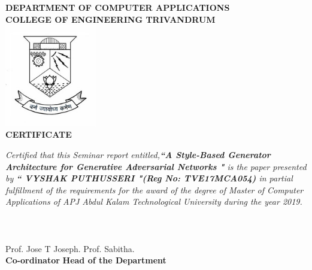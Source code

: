 
\begin{titlepage}
\begin{center}
\textbf{DEPARTMENT OF COMPUTER APPLICATIONS}\\[0.5cm]
\textbf{ COLLEGE OF ENGINEERING TRIVANDRUM}\\
[0.5cm]
\vspace{1.2cm}
\includegraphics[width=0.30\textwidth]{./cet}\\
\vspace{0.8cm}
\textbf{CERTIFICATE}\\
\end{center}
\emph{Certified that this Seminar report entitled,\textbf{``A Style-Based Generator Architecture for Generative Adversarial Networks "} is the paper presented by \textbf{`` VYSHAK PUTHUSSERI "(Reg No: TVE17MCA054)} in partial fulfillment of the requirements for the award of the degree of Master of Computer Applications of APJ Abdul Kalam Technological University during the year 2019.}\\\\\\\\
\vspace{0.5cm}
Prof. Jose T Joseph.
\hspace{9.5cm}
Prof. Sabitha.\\ 
\hspace{3.9cm} \textbf{Co-ordinator}
\hspace{9.2cm}
\textbf{Head of the Department}

\end{titlepage}
